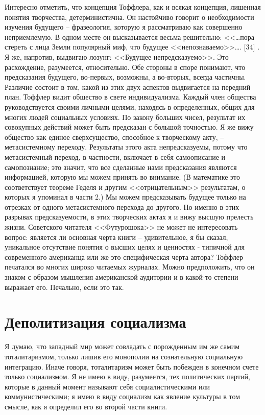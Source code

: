 \documentclass{book}
\begin{document}
Интересно отметить, что концепция Тоффлера, как и всякая концепция, лишенная понятия творчества, детерминистична. Он настойчиво говорит о необходимости изучения  будущего -- фразеология, которую я рассматриваю как совершенно непри­емлемую. В одном месте он высказывается весьма решитель­но: <<\ldots пора стереть с лица Земли популярный миф, что буду­щее <<непознаваемо>>\ldots. [34] . Я же, напротив, выдвигаю лозунг: <<Будущее непредсказуемо>>. Это расхождение, разумеется, от­носительно. Обе стороны в споре понимают, что предсказания будущего, во-первых, возможны, а во-вторых, всегда частичны. Различие состоит в том, какой из этих двух аспектов выд­вигается на передний план. Тоффлер видит общество в свете индивидуализма. Каждый член общества руководствуется своими личными целями, находясь в определенных, общих для многих людей социальных условиях. По закону больших чисел, результат их совокупных действий может быть предсказан с большой точностью. Я же вижу общество как единое сверх­существо, способное к творческому 
акту, -- метасистемному пе­реходу. Результаты этого акта непредсказуемы, потому что метасистемный переход, в частности, включает в себя самоописа­ние  и самопознание;  это значит, что все сделанные нами пред­сказания являются информацией, которую мы можем принять во внимание. (В математике это соответствует теореме Геделя и другим <<отрицательным>> результатам, о которых я упоминал в части 2.) Мы можем предсказывать будущее только на отрез­ках от одного метасистемного перехода до другого. Но именно в этих разрывах предсказуемости, в этих творческих актах я и вижу высшую прелесть жизни.
Советского читателя <<Футурошока>> не может не интересо­вать вопрос: является ли основная черта книги -- удивительное, я бы сказал, уникальное  отсутствие понятия о высших целях и ценностях - типичной для современного американца или же это специфическая черта автора? Тоффлер печатался во многих широко читаемых журналах. Можно предположить, что он зна­ком с образом мышления американской аудитории и в какой-то степени выражает его. Печально, если это так.


\section{Деполитизация социализма}

Я думаю, что западный мир может совладать с порожденным им же самим тоталитаризмом, только лишив его монополии на сознательную социальную интеграцию. Иначе говоря, тота­литаризм может быть побежден в конечном счете только со­циализмом. Я не имею в виду, разумеется, тех политических партий, которые в данный момент называют себя социалисти­ческими или коммунистическими; я имею в виду социализм как явление культуры в том смысле, как я определил его во второй части книги.
\end{document}
